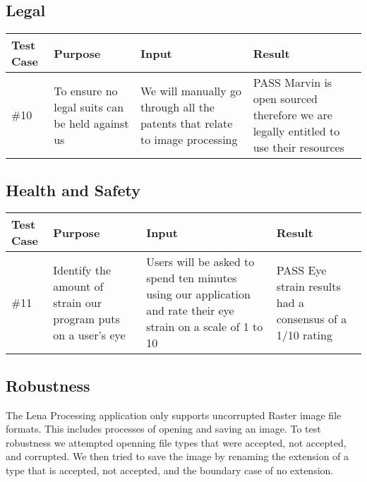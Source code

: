 \documentclass[12pt, titlepage]{article}
\begin{document}
\subsection{Legal}
\begin{table}[!hb]
\scriptsize
\begin{tabu} to 1.1\textwidth { | X[.3] | X[.7] | X[.7] | X[.7] |}
\hline
	      		Test Case & Purpose & Input & Result \\
\hline
\#10
& To ensure no legal suits can be held against us
& We will manually go through all the patents that relate to image processing
& PASS Marvin is open sourced therefore we are legally entitled to use their resources\\
\hline
	\end{tabu}
	\end{table}

\subsection{Health and Safety}
\begin{table}[!hb]
\scriptsize
\begin{tabu} to 1.1\textwidth { | X[.3] | X[.7] | X[.7] | X[.7] |}
\hline
	      		Test Case & Purpose & Input & Result \\
\hline
\#11
& Identify the amount of strain our program puts on a user’s eye
& Users will be asked to spend ten minutes using our application and rate their eye strain on a scale of 1 to 10
& PASS Eye strain results had a consensus of a 1/10 rating\\
\hline
	\end{tabu}
	\end{table}

\subsection{Robustness}
The Lena Processing application only supports uncorrupted Raster image file formats. This includes processes of opening and saving an image. To test robustness we attempted openning file types that were accepted, not accepted, and corrupted. We then tried to save the image by renaming the extension of a type that is accepted, not accepted, and the boundary case of no extension.
\end{document}
